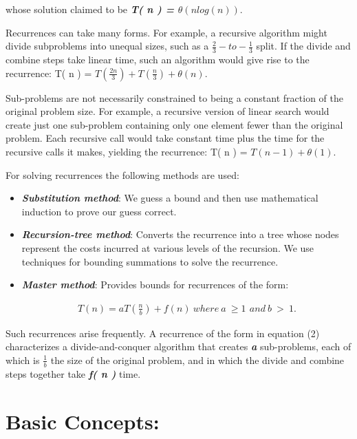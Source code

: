 \documentclass[10pt,a4paper]{article}
\begin{document}
whose solution claimed to be {\bfseries\itshape T( n ) = $\theta ( nlog( n ) )$}. \hfill \break

Recurrences can take many forms. For example, a recursive algorithm might divide subproblems into unequal sizes, such as a $\frac{2}{3}-to-\frac{1}{3}$ split.  If the divide and combine steps take linear time, such an algorithm would give rise to the recurrence: T( n ) = $T(\frac{2n}{3}) + T(\frac{n}{3}) + \theta ( n )$. \hfill \break

Sub-problems are not necessarily constrained to being a constant fraction of the original problem size. For example, a recursive version of linear search would create just one sub-problem containing only one element
fewer than the original problem. Each recursive call would take constant time plus the time for the recursive calls it makes, yielding the recurrence: T( n ) = $T( n - 1) + \theta ( 1 )$. \hfill \break

For solving recurrences the following methods are used:

\begin{itemize}
\item {\bfseries\itshape Substitution method}: We guess a bound and then use mathematical induction
to prove our guess correct.
\item {\bfseries\itshape Recursion-tree method}: Converts the recurrence into a tree whose nodes represent the costs incurred at various levels of the recursion. We use techniques for bounding summations to solve the recurrence.
\item {\bfseries\itshape Master method}: Provides bounds for recurrences of the form:

\begin{ceqn}
\begin{align}
T(n) = aT(\frac{n}{b}) + f(n) \ where\ a\ \geq 1\,\ and\ b\ >\ 1. 
\end{align}
\end{ceqn}
\end{itemize}

Such recurrences arise frequently. A recurrence of the form in equation (2) characterizes a divide-and-conquer
algorithm that creates {\bfseries\itshape a} sub-problems, each of which is {\bfseries\itshape $\frac{1}{b}$} the
size of the original problem, and in which the divide and combine steps together take {\bfseries\itshape f( n )} time.

\pagebreak

\section{Basic Concepts:}
\end{document}
